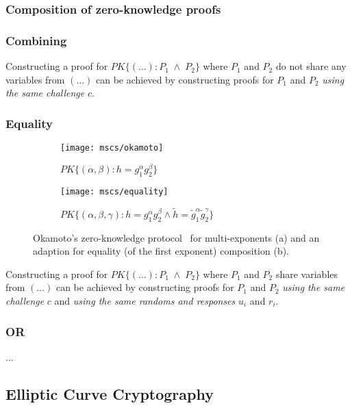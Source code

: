 \subsubsection{Composition of zero-knowledge proofs}

\subsubsection{Combining}

Constructing a proof for $PK\{(\dots) : P_1 \;\land\; P_2 \}$ where $P_1$ and $P_2$ do not share any variables from $(\dots)$ can be achieved by constructing proofs for $P_1$ and $P_2$ \emph{using the same challenge} $c$.

\subsubsection{Equality}

\begin{figure}
  \centering
  \begin{subfigure}[b]{0.45\textwidth}
    \texttt{[image: mscs/okamoto]}
    \caption{$PK\{(\alpha, \beta) : h = g_1^\alpha g_2^\beta \}$}
    \label{msc:okamoto}
  \end{subfigure}
  \quad
  \begin{subfigure}[b]{0.45\textwidth}
    \texttt{[image: mscs/equality]}
    \caption{$PK\{(\alpha, \beta, \gamma) : h = g_1^\alpha g_2^\beta \land \tilde{h} = \tilde{g}_1^\alpha \tilde{g}_2^\gamma\}$}
    \label{msc:equality}
  \end{subfigure}
  \caption{Okamoto's zero-knowledge protocol~\cite{Okamoto1993} for multi-exponents (a) and an adaption for equality (of the first exponent) composition (b).}
  \label{fig:okamoto}
\end{figure}

Constructing a proof for $PK\{(\dots) : P_1 \;\land\; P_2 \}$ where $P_1$ and $P_2$ share variables from $(\dots)$ can be achieved by constructing proofs for $P_1$ and $P_2$ \emph{using the same challenge} $c$ and \emph{using the same randoms and responses} $u_i$ and $r_i$.


\subsubsection{OR} ...


\subsection{Elliptic Curve Cryptography}

